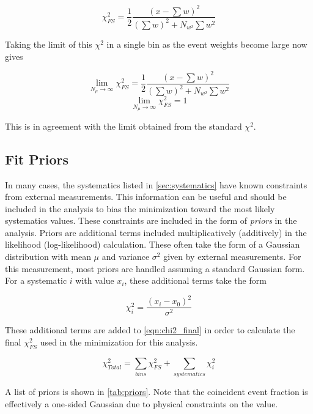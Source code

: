 \label{eqn:chi2_final}
\begin{equation}
	\chi^2_{FS} =\frac{1}{2}\frac{\left(x-\sum w\right)^2}{\left(\sum{w}\right)^2 + N_{w^2}\sum{w^2}}
\end{equation}

Taking the limit of this $\chi^2$ in a single bin as the event weights become large now gives

\begin{equation}
	\lim_{N_{\mu}\rightarrow\infty}  \chi^2_{FS} =\frac{1}{2}\frac{\left(x-\sum w\right)^2}{\left(\sum{w}\right)^2 + N_{w^2}\sum{w^2}}
\end{equation}
\begin{equation}
	\lim_{N_{\mu}\rightarrow\infty} \chi^2_{FS} = 1
\end{equation}

This is in agreement with the limit obtained from the standard $\chi^2$.

\subsection{Fit Priors}
In many cases, the systematics listed in \ref{sec:systematics} have known constraints from external measurements.
This information can be useful and should be included in the analysis to bias the minimization toward the most likely systematics values.
These constraints are included in the form of \emph{priors} in the analysis.
Priors are additional terms included multiplicatively (additively) in the likelihood (log-likelihood) calculation.
These often take the form of a Gaussian distribution with mean $\mu$ and variance $\sigma^2$ given by external measurements.
For this measurement, most priors are handled assuming a standard Gaussian form.
For a systematic $i$ with value $x_i$, these additional terms take the form

\begin{equation}
	\chi^2_{i} =  \frac{\left(x_i-x_0\right)^2}{\sigma^2}
\end{equation}

These additional terms are added to \ref{eqn:chi2_final} in order to calculate the final $\chi^2_{FS}$ used in the minimization for this analysis.

\begin{equation}
	\chi^2_{Total} = \sum_{bins} \chi^2_{FS} + \sum_{systematics} \chi^2_{i}
\end{equation}

A list of priors is shown in \ref{tab:priors}.
Note that the coincident event fraction is effectively a one-sided Gaussian due to physical constraints on the value.


